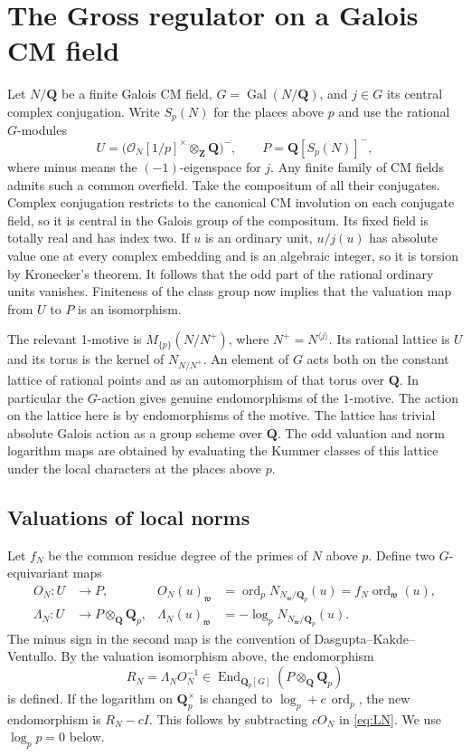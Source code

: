 \documentclass[11pt]{amsart}
\numberwithin{equation}{section}
\theoremstyle{definition}
\theoremstyle{remark}
\newcommand{\Q}{\mathbf Q}
\newcommand{\Z}{\mathbf Z}
\newcommand{\OO}{\mathcal O}
\newcommand{\Gal}{\operatorname{Gal}}
\newcommand{\ord}{\operatorname{ord}}
\newcommand{\End}{\operatorname{End}}
\begin{document}
\section{The Gross regulator on a Galois CM field}
\label{sec:galois}

Let $N/\Q$ be a finite Galois CM field, $G=\Gal(N/\Q)$,
and $j\in G$ its central complex conjugation. Write
$S_p(N)$ for the places above $p$ and use the rational
$G$-modules
\[
 U=\bigl(\OO_N[1/p]^\times\otimes_\Z\Q\bigr)^-,
 \qquad P=\Q[S_p(N)]^- ,
\]
where minus means the $(-1)$-eigenspace for $j$.
Any finite family of CM fields admits such a common overfield.
Take the compositum of all their conjugates. Complex conjugation
restricts to the canonical CM involution on each conjugate
field, so it is central in the Galois group of the compositum.
Its fixed field is totally real and has index two.
If $u$ is an ordinary unit, $u/j(u)$ has absolute value
one at every complex embedding and is an algebraic integer,
so it is torsion by Kronecker's theorem. It follows that
the odd part of the rational ordinary units vanishes.
Finiteness of the class group now implies that the
valuation map from $U$ to $P$ is an isomorphism.

The relevant 1-motive is $M_{\{p\}}(N/N^+)$, where $N^+=N^{\langle
j\rangle}$. Its rational lattice is $U$ and its torus is the
kernel of $N_{N/N^+}$. An element of $G$ acts both on the
constant lattice of rational points and as an automorphism
of that torus over $\Q$. In particular the $G$-action
gives genuine endomorphisms of the 1-motive. The action on
the lattice here is by endomorphisms of the motive.
The lattice has trivial absolute Galois action as a group
scheme over $\Q$. The odd valuation and norm logarithm maps
are obtained by evaluating the Kummer classes of this lattice
under the local characters at the places above $p$.

\subsection{Valuations of local norms}

Let $f_N$ be the common residue degree of the primes of
$N$ above $p$. Define two $G$-equivariant maps
\begin{align}
 O_N:U&\longrightarrow P,&
       O_N(u)_{\mathfrak w}
       &= \ord_p N_{N_\mathfrak w/\Q_p}(u)
        = f_N\ord_\mathfrak w(u),\label{eq:ON}\\
 \Lambda_N:U&\longrightarrow P\otimes_\Q\Q_p,&
       \Lambda_N(u)_{\mathfrak w}
       &= -\log_p N_{N_\mathfrak w/\Q_p}(u).\label{eq:LN}
\end{align}
The minus sign in the second map is the convention of
Dasgupta--Kakde--Ventullo. By the valuation isomorphism
above, the endomorphism
\begin{equation}\label{eq:RN}
 R_N=\Lambda_NO_N^{-1}\in\End_{\Q_p[G]}(P\otimes_\Q\Q_p)
\end{equation}
is defined. If the logarithm on $\Q_p^\times$ is changed
to $\log_p+c\,\ord_p$, the new endomorphism is $R_N-cI$.
This follows by subtracting $cO_N$ in \eqref{eq:LN}.
We use $\log_p p=0$ below.
\end{document}
